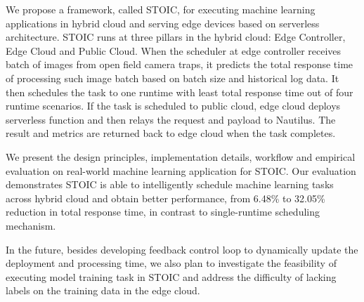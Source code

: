 We propose a framework, called STOIC, for executing machine learning applications in hybrid cloud and serving edge devices based on serverless architecture. STOIC runs at three pillars in the hybrid cloud: Edge Controller, Edge Cloud and Public Cloud. When the scheduler at edge controller receives batch of images from open field camera traps, it predicts the total response time of processing such image batch based on batch size and historical log data. It then schedules the task to one runtime with least total response time out of four runtime scenarios. If the task is scheduled to public cloud, edge cloud deploys serverless function and then relays the request and payload to Nautilus. The result and metrics are returned back to edge cloud when the task completes.

We present the design principles, implementation details, workflow and empirical evaluation on real-world machine learning application for STOIC. Our evaluation demonstrates STOIC is able to intelligently schedule machine learning tasks across hybrid cloud and obtain better performance, from 6.48\% to 32.05\% reduction in total response time, in contrast to single-runtime scheduling mechanism.

In the future, besides developing feedback control loop to dynamically update the deployment and processing time, we also plan to investigate the feasibility of executing model training task in STOIC and address the difficulty of lacking labels on the training data in the edge cloud.